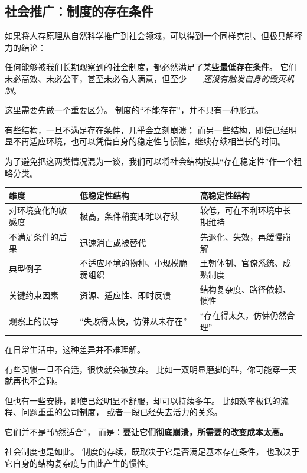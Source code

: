 \documentclass[../main.tex]{subfiles}
\begin{document}
	\subsection{社会推广：制度的存在条件}
	
	如果将人存原理从自然科学推广到社会领域，可以得到一个同样克制、但极具解释力的结论：
	
	任何能够被我们长期观察到的社会制度，都必然满足了某些\textbf{最低存在条件}。  
	它们未必高效、未必公平，甚至未必令人满意，但至少——\textit{还没有触发自身的毁灭机制}。
	
	这里需要先做一个重要区分。  
	制度的“不能存在”，并不只有一种形式。
	
	有些结构，一旦不满足存在条件，几乎会立刻崩溃；  
	而另一些结构，即使已经明显不再适应环境，也可以凭借自身的稳定性与惯性，继续存续相当长的时间。
	
	为了避免把这两类情况混为一谈，我们可以将社会结构按其“存在稳定性”作一个粗略分类。
	
	
	\begin{center}
		\begin{tabular}{|p{3.5cm}|p{5cm}|p{5cm}|}
			\hline
			\textbf{维度} & \textbf{低稳定性结构} & \textbf{高稳定性结构} \\
			\hline
			对环境变化的敏感度 &
			极高，条件稍变即难以存续 &
			较低，可在不利环境中长期维持 \\
			\hline
			不满足条件的后果 &
			迅速消亡或被替代 &
			先退化、失效，再缓慢崩解 \\
			\hline
			典型例子 &
			不适应环境的物种、小规模脆弱组织 &
			王朝体制、官僚系统、成熟制度 \\
			\hline
			关键约束因素 &
			资源、适应性、即时反馈 &
			结构复杂度、路径依赖、惯性 \\
			\hline
			观察上的误导 &
			“失败得太快，仿佛从未存在” &
			“存在得太久，仿佛仍然合理” \\
			\hline
		\end{tabular}
	\end{center}
	
	
	在日常生活中，这种差异并不难理解。
	
	有些习惯一旦不合适，很快就会被放弃。  
	比如一双明显磨脚的鞋，你可能穿一天就再也不会碰。
	
	但也有一些安排，即使已经明显不舒服，却可以持续多年。  
	比如效率极低的流程、问题重重的公司制度，  
	或者一段已经失去活力的关系。
	
	它们并不是“仍然适合”，  
	而是：\textbf{要让它们彻底崩溃，所需要的改变成本太高。}
	
	社会制度也是如此。  
	制度的存续，既取决于它是否满足基本存在条件，  
	也取决于它自身的结构复杂度与由此产生的惯性。
	
\end{document}
